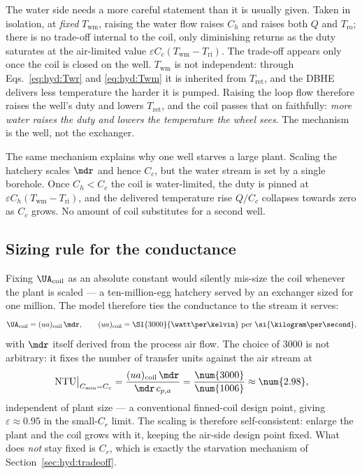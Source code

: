 The water side needs a more careful statement than it is usually given. Taken in isolation, at
\emph{fixed} $T_{\mathrm{wm}}$, raising the water flow raises $C_h$ and raises both $Q$ and
$T_{\mathrm{ro}}$; there is no trade-off internal to the coil, only diminishing returns as the
duty saturates at the air-limited value $\varepsilon C_c(T_{\mathrm{wm}}-T_{\mathrm{ri}})$. The
trade-off appears only once the coil is closed on the well. $T_{\mathrm{wm}}$ is not
independent: through Eqs.~\eqref{eq:hyd:Twr} and \eqref{eq:hyd:Twm} it is inherited from
$T_{\mathrm{ret}}$, and the DBHE delivers less temperature the harder it is pumped. Raising the
loop flow therefore raises the well's duty and lowers $T_{\mathrm{ret}}$, and the coil passes
that on faithfully: \emph{more water raises the duty and lowers the temperature the wheel
sees}. The mechanism is the well, not the exchanger.

The same mechanism explains why one well starves a large plant. Scaling the hatchery scales
$\mdr$ and hence $C_c$, but the water stream is set by a single borehole. Once $C_h<C_c$ the
coil is water-limited, the duty is pinned at $\varepsilon
C_h(T_{\mathrm{wm}}-T_{\mathrm{ri}})$, and the delivered temperature rise $Q/C_c$ collapses
towards zero as $C_c$ grows. No amount of coil substitutes for a second well.

\subsection{Sizing rule for the conductance}
\label{sec:hyd:sizing}

Fixing $\UA_{\mathrm{coil}}$ as an absolute constant would silently mis-size the coil whenever
the plant is scaled --- a ten-million-egg hatchery served by an exchanger sized for one
million. The model therefore ties the conductance to the stream it serves:
\begin{equation}
\UA_{\mathrm{coil}}=(ua)_{\mathrm{coil}}\,\mdr ,
\qquad
(ua)_{\mathrm{coil}}=\SI{3000}{\watt\per\kelvin}\ \text{per}\
\si{\kilogram\per\second},
\label{eq:hyd:UAcoil}
\end{equation}
with $\mdr$ itself derived from the process air flow. The choice of \num{3000} is not
arbitrary: it fixes the number of transfer units against the air stream at
\begin{equation}
\mathrm{NTU}\big|_{C_{\min}=C_c}
=\frac{(ua)_{\mathrm{coil}}\,\mdr}{\mdr\,c_{p,a}}
=\frac{\num{3000}}{\num{1006}}\approx\num{2.98},
\label{eq:hyd:NTUair}
\end{equation}
independent of plant size --- a conventional finned-coil design point, giving
$\varepsilon\approx\num{0.95}$ in the small-$C_r$ limit. The scaling is therefore
self-consistent: enlarge the plant and the coil grows with it, keeping the air-side design
point fixed. What does \emph{not} stay fixed is $C_r$, which is exactly the starvation
mechanism of Section~\ref{sec:hyd:tradeoff}.

